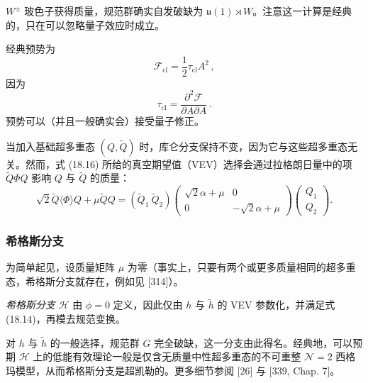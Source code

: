$W^\pm$ 玻色子获得质量，规范群确实自发破缺为 $\mathfrak{u}(1)\rtimes W$。注意这一计算是经典的，只在可以忽略量子效应时成立。

经典预势为
\begin{equation}
\mathcal F_{\mathrm{cl}}=\frac{1}{2}\tau_{\mathrm{cl}}A^2\,, \tag{18.17}
\end{equation}
因为
\[
\tau_{\mathrm{cl}}=\frac{\partial^2\mathcal F}{\partial A\partial A}\,.
\]
预势可以（并且一般确实会）接受量子修正。

当加入基础超多重态 $(Q,\tilde Q)$ 时，库仑分支保持不变，因为它与这些超多重态无关。然而，式 (18.16) 所给的真空期望值（VEV）选择会通过拉格朗日量中的项 $\tilde Q\Phi Q$ 影响 $Q$ 与 $\tilde Q$ 的质量：
\begin{equation}
\sqrt{2}\tilde Q\langle\Phi\rangle Q+\mu\tilde Q Q
=\left(\tilde Q_1\ \tilde Q_2\right)
\begin{pmatrix} \sqrt{2}\alpha+\mu & 0\\ 0 & -\sqrt{2}\alpha+\mu\end{pmatrix}
\begin{pmatrix} Q_1\\ Q_2\end{pmatrix}.
\tag{18.18}
\end{equation}

\subsubsection*{希格斯分支}

为简单起见，设质量矩阵 $\mu$ 为零（事实上，只要有两个或更多质量相同的超多重态，希格斯分支就存在，例如见 [314]）。

\begin{definition}[18.14]
\emph{希格斯分支} $\mathcal H$ 由 $\phi=0$ 定义，因此仅由 $h$ 与 $\tilde h$ 的 VEV 参数化，并满足式 (18.14)，再模去规范变换。
\end{definition}


对 $h$ 与 $\tilde h$ 的一般选择，规范群 $G$ 完全破缺，这一分支由此得名。经典地，可以预期 $\mathcal H$ 上的低能有效理论一般是仅含无质量中性超多重态的不可重整 $\mathcal N=2$ 西格玛模型，从而希格斯分支是超凯勒的。更多细节参阅 [26] 与 [339, Chap. 7]。

